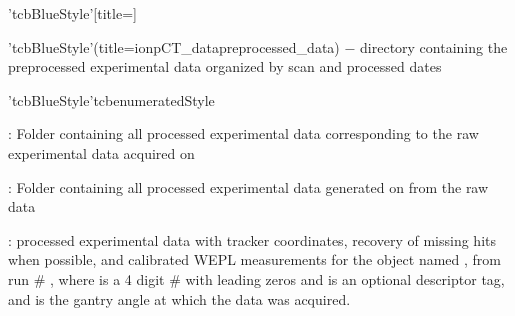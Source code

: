 \vspace{3mm}
\begin{tcbfunctionenv}'tcbBlueStyle'[title=]
\begin{tcbparagraph}'tcbBlueStyle'(title=\dirsep ion\dirsep pCT\_data\dirsep preprocessed\_data)%
$\boldsymbol{-}$ directory containing the preprocessed experimental data organized by scan and processed dates
\end{tcbparagraph}
\begin{tcbparagraph}'tcbBlueStyle'{tcbenumeratedStyle}
	\begin{deepList}[labelindent=1pt, leftmargin=*]
	    \item {} : Folder containing all processed experimental data corresponding to the raw experimental data acquired on 
	    \begin{deepList}[labelindent=1pt, leftmargin=*]
	        \item {} : Folder containing all processed experimental data generated on  from the raw data
	        \begin{deepList}[labelindent=1pt, leftmargin=*]
	            \item {} : processed experimental data with tracker coordinates, recovery of missing hits when possible, and calibrated WEPL measurements for the object named , from run \# , where  is a 4 digit \# with leading zeros and  is an optional descriptor tag, and  is the gantry angle at which the data was acquired.
	        \end{deepList}
	    \end{deepList}
	\end{deepList}
\end{tcbparagraph}
\end{tcbfunctionenv}
\endinput